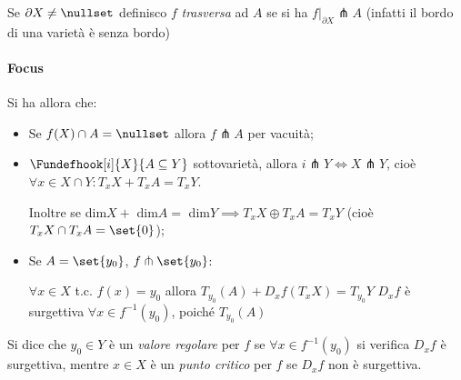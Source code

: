 \begin{defn}
Se $\partial X \neq \nullset$ definisco $f$ \emph{trasversa} ad $A$ se si ha $f|_{\partial X} \pitchfork A$ (infatti il bordo di una varietà è senza bordo)
\end{defn}

\paragraph{Focus}
Si ha allora che:
\begin{itemize}
\item Se $f(X) \cap A = \nullset$ allora $f \pitchfork A$ per vacuità;
\item $\Fundefhook[i]{X}{A \subseteq Y}$ sottovarietà, allora $i \pitchfork Y \iff X \pitchfork Y$, cioè $\forall x \in X\cap Y: T_xX + T_xA = T_xY$.

Inoltre se dim$X +$ dim$A =$ dim$Y \implies T_xX \oplus T_xA = T_xY$ (cioè $T_xX \cap T_xA = \set{0}$);
\item Se $A = \set{y_0}$, $f \pitchfork \set{y_0}$:

$\forall x \in X$ t.c. $f(x) = y_0$ allora $T_{y_0}(A) + D_xf(T_xX) = T_{y_0}Y$ \iff $D_xf$ è surgettiva $\forall x \in f^{-1}(y_0)$, poiché $T_{y_0}(A)$
\end{itemize}

\begin{defn}
Si dice che $y_0 \in Y$ è un \emph{valore regolare} per $f$ se $\forall x \in f^{-1}(y_0)$ si verifica $D_xf$ è surgettiva, mentre $x \in X$ è un \emph{punto critico} per $f$ se $D_xf$ non è surgettiva.
\end{defn}
